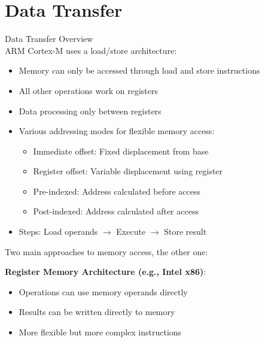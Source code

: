 \section{Data Transfer}

\begin{concept}{Data Transfer Overview}\\
ARM Cortex-M uses a load/store architecture:
\begin{itemize}
  \item Memory can only be accessed through load and store instructions
  \item All other operations work on registers
  \item Data processing only between registers
  \item Various addressing modes for flexible memory access:
    \begin{itemize}
      \item Immediate offset: Fixed displacement from base
      \item Register offset: Variable displacement using register
      \item Pre-indexed: Address calculated before access
      \item Post-indexed: Address calculated after access
    \end{itemize}
    \item Steps: Load operands $\rightarrow$ Execute $\rightarrow$ Store result
\end{itemize}
\end{concept}

\begin{remark}
Two main approaches to memory access, the other one:

\textbf{Register Memory Architecture (e.g., Intel x86)}:
    \begin{itemize}
      \item Operations can use memory operands directly
      \item Results can be written directly to memory
      \item More flexible but more complex instructions
    \end{itemize}
\end{remark}

